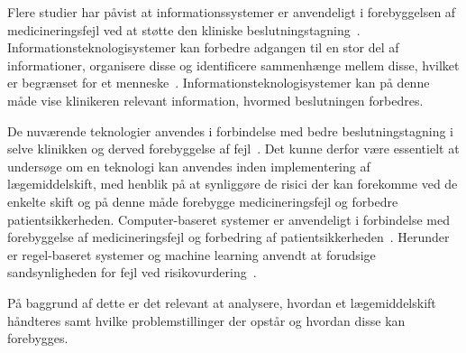 Flere studier har påvist at informationssystemer er anvendeligt i forebyggelsen af medicineringsfejl ved at støtte den kliniske beslutningstagning~\citep{Agrawal2009,Anderson2002}. 
Informationsteknologisystemer kan forbedre adgangen til en stor del af informationer, organisere disse og identificere sammenhænge mellem disse, hvilket er begrænset for et menneske~\citep{Agrawal2009}. Informationsteknologisystemer kan på denne måde vise klinikeren relevant information, hvormed beslutningen forbedres.~\citep{Agrawal2009}

De nuværende teknologier anvendes i forbindelse med bedre beslutningstagning i selve klinikken og derved forebyggelse af fejl~\citep{Agrawal2009, Kaushal2002, Stenner2010, Fischer2008, Simpson2008}. Det kunne derfor være essentielt at undersøge om en teknologi kan anvendes inden implementering af lægemiddelskift, med henblik på at synliggøre de risici der kan forekomme ved de enkelte skift og på denne måde forebygge medicineringsfejl og forbedre patientsikkerheden. Computer-baseret systemer er anvendeligt i forbindelse med forebyggelse af medicineringsfejl og forbedring af patientsikkerheden~\citep{Agrawal2009,Masys2006}. Herunder er regel-baseret systemer og machine learning anvendt at forudsige sandsynligheden for fejl ved risikovurdering~\citep{Geissert2018}. %

På baggrund af dette er det relevant at analysere, hvordan et lægemiddelskift håndteres samt hvilke problemstillinger der opstår og hvordan disse kan forebygges. 





